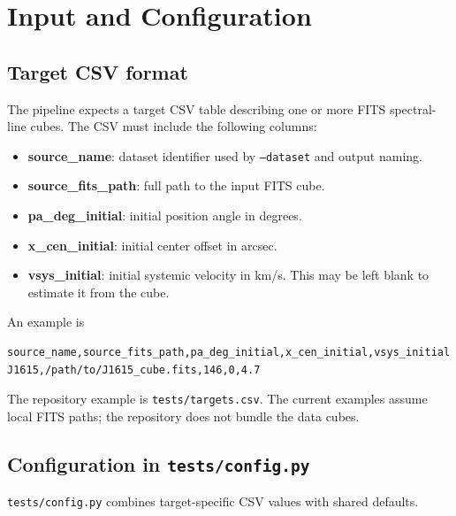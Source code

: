 \documentclass{report}
\begin{document}
\chapter{Input and Configuration \label{sec:prep_sec}}

\section{Target CSV format \label{sec:format_data}}
The pipeline expects a target CSV table describing one or more FITS spectral-line cubes. The CSV must include the following columns:
\begin{itemize}
    \item \textbf{source\_name}: dataset identifier used by \texttt{--dataset} and output naming.
    \item \textbf{source\_fits\_path}: full path to the input FITS cube.
    \item \textbf{pa\_deg\_initial}: initial position angle in degrees.
    \item \textbf{x\_cen\_initial}: initial center offset in arcsec.
    \item \textbf{vsys\_initial}: initial systemic velocity in km/s. This may be left blank to estimate it from the cube.
\end{itemize}

An example is
\begin{verbatim}
source_name,source_fits_path,pa_deg_initial,x_cen_initial,vsys_initial
J1615,/path/to/J1615_cube.fits,146,0,4.7
\end{verbatim}

The repository example is \texttt{tests/targets.csv}. The current examples assume local FITS paths; the repository does not bundle the data cubes.

\section{Configuration in \texttt{tests/config.py}}
\texttt{tests/config.py} combines target-specific CSV values with shared defaults.
\end{document}
